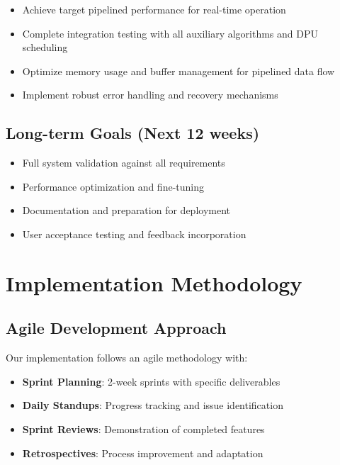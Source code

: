 \begin{itemize}
\item Achieve target pipelined performance for real-time operation
\item Complete integration testing with all auxiliary algorithms and DPU scheduling
\item Optimize memory usage and buffer management for pipelined data flow
\item Implement robust error handling and recovery mechanisms
\end{itemize}

\subsection{Long-term Goals (Next 12 weeks)}\label{subsec:long-term-goals}

\begin{itemize}
\item Full system validation against all requirements
\item Performance optimization and fine-tuning
\item Documentation and preparation for deployment
\item User acceptance testing and feedback incorporation
\end{itemize}

\section{Implementation Methodology}\label{subsec:implementation-methodology}

\subsection{Agile Development Approach}\label{subsec:agile-approach}

Our implementation follows an agile methodology with:

\begin{itemize}
\item \textbf{Sprint Planning}: 2-week sprints with specific deliverables
\item \textbf{Daily Standups}: Progress tracking and issue identification
\item \textbf{Sprint Reviews}: Demonstration of completed features
\item \textbf{Retrospectives}: Process improvement and adaptation
\end{itemize}

